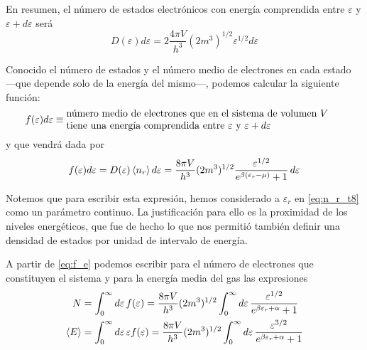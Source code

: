 En resumen, el número de estados electrónicos con energía comprendida entre $\varepsilon$ y $\varepsilon+d\varepsilon$ será
\begin{equation}
	D(\varepsilon) d\varepsilon = 2\frac{4\pi V}{h^3} (2m^3)^{1/2} \varepsilon^{1/2} d\varepsilon
\end{equation}

Conocido el número de estados y el número medio de electrones en cada estado ---que depende solo de la energía del mismo---, podemos calcular la siguiente función:
\begin{equation}
	f(\varepsilon) d\varepsilon \equiv \parbox{28em}{número medio de electrones que en el sistema de volumen $V$ \\tiene una energía comprendida entre $\varepsilon$ y $\varepsilon+d\varepsilon$} 
\end{equation}
y que vendrá dada por
\begin{equation}\label{eq:f_e}
	f(\varepsilon) d\varepsilon = D(\varepsilon)\expval{n_r} d\varepsilon = \frac{8\pi V}{h^3} (2m^3)^{1/2} \frac{\varepsilon^{1/2}}{e^{\beta(\varepsilon_r -\mu)} + 1} \dd{\varepsilon}
\end{equation}

\begin{wrapfigure}{r}{0.35\textwidth}
	\centering
	\hspace{1.8cm}
	
	\vspace{-1cm}
\end{wrapfigure}
Notemos que para escribir esta expresión, hemos considerado a $\varepsilon_r$ en \eqref{eq:n_r_t8} como un parámetro continuo.
La justificación para ello es la proximidad de los niveles energéticos, que fue de hecho lo que nos permitió también definir una densidad de estados por unidad de intervalo de energía.

A partir de \eqref{eq:f_e} podemos escribir para el número de electrones que constituyen el sistema y para la energía media del gas las expresiones
\begin{align}
	N &= \int_{0}^{\infty} \dd{\varepsilon} f(\varepsilon) = \frac{8\pi V}{h^3} (2m^3)^{1/2} \int_{0}^{\infty} \dd{\varepsilon} \frac{\varepsilon^{1/2}}{e^{\beta\varepsilon_r + \alpha} + 1} \label{eq:N_FD}\\
	\expval{E} &= \int_{0}^{\infty} \dd{\varepsilon} \varepsilon f(\varepsilon) = \frac{8\pi V}{h^3} (2m^3)^{1/2} \int_{0}^{\infty} \dd{\varepsilon} \frac{\varepsilon^{3/2}}{e^{\beta\varepsilon_r + \alpha} + 1}
\end{align}

